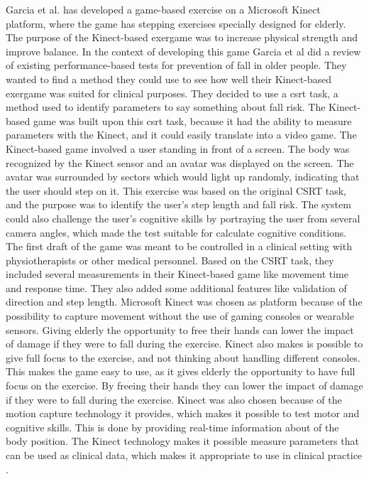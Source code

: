 Garcia et al. \cite{garcia2012exergames} has developed a game-based exercise on a Microsoft Kinect platform, where the game has stepping exercises specially designed for elderly. The purpose of the Kinect-based exergame was to increase physical strength and improve balance. In the context of developing this game Garcia et al did a review of existing performance-based tests for prevention of fall in older people. They wanted to find a method they could use to see how well their Kinect-based exergame was suited for clinical purposes. They decided to use a \ac{csrt} task, a method used to identify parameters to say something about fall risk.  The Kinect-based game was built upon this \ac{csrt} task, because it had the ability to measure parameters with the Kinect, and it could easily translate into a video game. The Kinect-based game involved a user standing in front of a screen. The body was recognized by the Kinect sensor and an avatar was displayed on the screen.  The avatar was surrounded by sectors which would light up randomly, indicating that the user should step on it. This exercise was based on the original CSRT task, and the purpose was to identify the user’s step length and fall risk. The system could also challenge the user’s cognitive skills by portraying the user from several camera angles, which made the test suitable for calculate cognitive conditions.  The first draft of the game was meant to be controlled in a clinical setting with physiotherapists or other medical personnel. Based on the CSRT task, they included several measurements in their Kinect-based game like movement time and response time. They also added some additional features like validation of direction and step length.  Microsoft Kinect was chosen as platform because of the possibility to capture movement without the use of gaming consoles or wearable sensors. Giving elderly the opportunity to free their hands can lower the impact of damage if they were to fall during the exercise. Kinect also makes is possible to give full focus to the exercise, and not thinking about handling different consoles. This makes the game easy to use, as it gives elderly the opportunity to have full focus on the exercise. By freeing their hands they can lower the impact of damage if they were to fall during the exercise. Kinect was also chosen because of the motion capture technology it provides, which makes it possible to test motor and cognitive skills. This is done by providing real-time information about of the body position. The Kinect technology makes it possible measure parameters that can be used as clinical data, which makes it appropriate to use in clinical practice \cite{garcia2012exergames}.\\ \\
